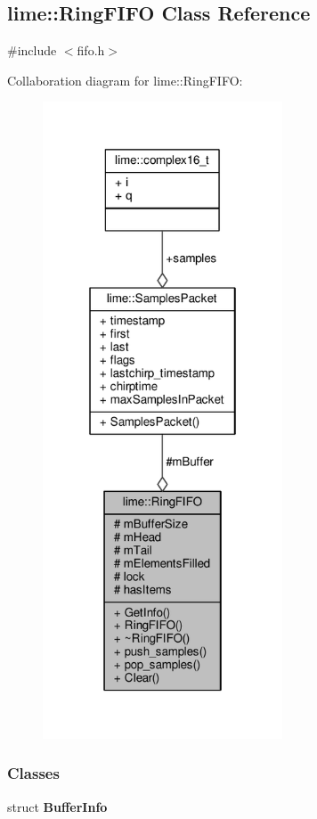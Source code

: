 \subsection{lime\+:\+:Ring\+F\+I\+FO Class Reference}
\label{classlime_1_1RingFIFO}


{\ttfamily \#include $<$fifo.\+h$>$}



Collaboration diagram for lime\+:\+:Ring\+F\+I\+FO\+:
\nopagebreak
\begin{figure}[H]
\begin{center}
\leavevmode
\includegraphics[width=202pt]{d7/dcb/classlime_1_1RingFIFO__coll__graph}
\end{center}
\end{figure}
\subsubsection*{Classes}
\begin{DoxyCompactItemize}
\item 
struct {\bf Buffer\+Info}
\end{DoxyCompactItemize}
